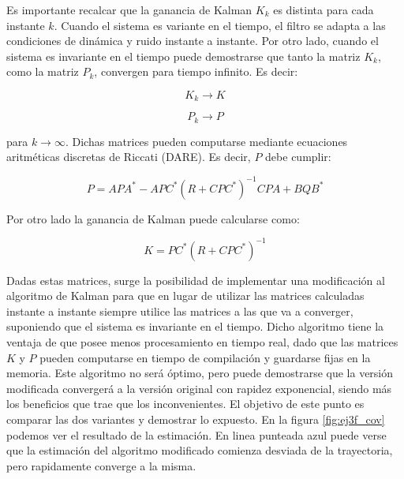 
	Es importante recalcar que la ganancia de Kalman $K_k$ es distinta para cada instante $k$. Cuando el sistema es variante en el tiempo, el filtro se adapta a las condiciones de dinámica y ruido instante a instante. Por otro lado, cuando el sistema es invariante en el tiempo puede demostrarse que tanto la matriz $K_k$, como la matriz $P_k$, convergen para tiempo infinito. Es decir:
	
	\begin{equation*}
		K_k \longrightarrow K
	\end{equation*}
	
	\begin{equation*}
		P_k \longrightarrow P
	\end{equation*}
	
	para $k \rightarrow \infty$. Dichas matrices pueden computarse mediante ecuaciones aritméticas discretas de Riccati (DARE). Es decir, $P$ debe cumplir:
	
	\begin{equation*}
		P = A P A^{*} - A P C^{*} (R + C P C^{*})^{-1} C P A + B Q B^{*}
	\end{equation*}
	
	Por otro lado la ganancia de Kalman puede calcularse como:
	
	\begin{equation*}
		K = P C^{*} (R + C P C^{*})^{-1}
	\end{equation*}
	
	Dadas estas matrices, surge la posibilidad de implementar una modificación al algoritmo de Kalman para que en lugar de utilizar las matrices calculadas instante a instante siempre utilice las matrices a las que va a converger, suponiendo que el sistema es invariante en el tiempo. Dicho algoritmo tiene la ventaja de que posee menos procesamiento en tiempo real, dado que las matrices $K$ y $P$ pueden computarse en tiempo de compilación y guardarse fijas en la memoria. Este algoritmo no será óptimo, pero puede demostrarse que la versión modificada convergerá a la versión original con rapidez exponencial, siendo más los beneficios que trae que los inconvenientes. El objetivo de este punto es comparar las dos variantes y demostrar lo expuesto. En la figura \ref{fig:ej3f_cov} podemos ver el resultado de la estimación. En linea punteada azul puede verse que la estimación del algoritmo modificado comienza desviada de la trayectoria, pero rapidamente converge a la misma. 

